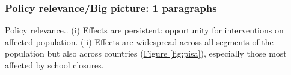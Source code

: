 

\subsubsection{Policy relevance/Big picture: 1 paragraphs}

Policy relevance.. (i) Effects are persistent: opportunity for interventions on affected population. (ii) Effects are widespread across all segments of the population but also across countries (\hyperref[fig:pisa]{Figure \ref{fig:pisa}}), especially those most affected by school closures.

